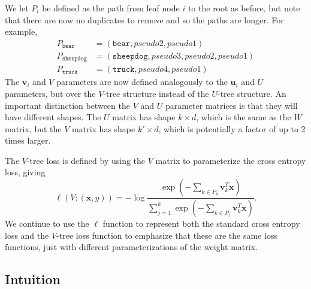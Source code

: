 \documentclass[twoside]{article}
\newcommand{\trans}[1]{{#1}^{T}}
\newcommand{\vv}{\mathbf v}
\newcommand{\uu}{\mathbf u}
\newcommand{\w}{\mathbf w}
\newcommand{\x}{\mathbf x}
\begin{document}
We let $P_i$ be defined as the path from leaf node $i$ to the root as before,
but note that there are now no duplicates to remove and so the paths are longer.
For example,
\begin{equation*}
\begin{split}
    P_{\texttt{bear}} &= (\texttt{bear}, \textit{pseudo2}, \textit{pseudo1}) \\
    P_{\texttt{sheepdog}} &= (\texttt{sheepdog}, \textit{pseudo3}, \textit{pseudo2}, \textit{pseudo1} ) \\
    P_{\texttt{truck}} &= (\texttt{truck}, \textit{pseudo4}, \textit{pseudo1} )
\end{split}
\end{equation*}
The $\vv_i$ and $V$ parameters are now defined analogously to the $\uu_i$ and $U$ parameters, but over the $V$-tree structure instead of the $U$-tree structure.
An important distinction between the $V$ and $U$ parameter matrices is that they will have different shapes.
The $U$ matrix has shape $k \times d$, which is the same as the $W$ matrix,
but the $V$ matrix has shape $k' \times d$,
which is potentially a factor of up to 2 times larger.

The $V$-tree loss is defined by using the $V$ matrix to parameterize the cross entropy loss, giving
\begin{equation}
    \ell(V;(\x,y)) = - \log \frac {\exp(-\sum_{k\in P_y}\trans\vv_k \x)}{\sum_{j=1}^k \exp(- \sum_{k\in P_j}\trans\vv_k \x)}
    .
\end{equation}
We continue to use the $\ell$ function to represent both the standard cross entropy loss and the $V$-tree loss function to emphasize that these are the same loss functions,
just with different parameterizations of the weight matrix.

\subsection{Intuition}
\end{document}
